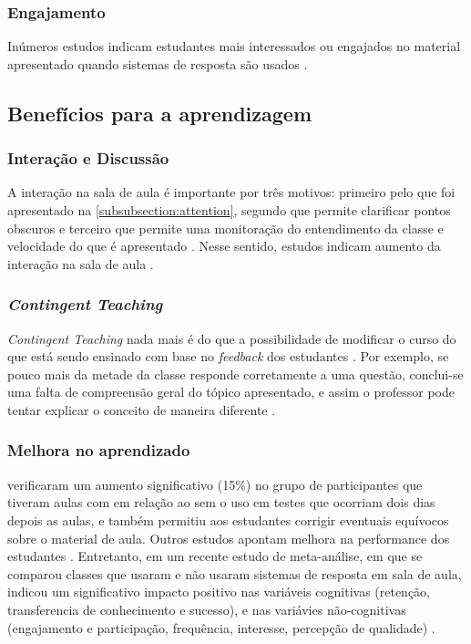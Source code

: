 \subsubsection{Engajamento}
Inúmeros estudos indicam estudantes mais interessados ou engajados no material
apresentado quando sistemas de resposta são usados
\cite{Kaya2016, Rana2016, Horne2015, Mattos2015, Moratelli2014, Kulatunga2014, Blood2013, Terrion2012,
Caldwell2007}.

\subsection{Benefícios para a aprendizagem}

\subsubsection{Interação e Discussão}
A interação na sala de aula é importante por três motivos: primeiro pelo que foi
apresentado na \autoref{subsubsection:attention}, segundo que permite clarificar
pontos obscuros e terceiro que permite uma monitoração do entendimento da classe
e velocidade do que é apresentado \cite{DInverno2003}. Nesse sentido, estudos
indicam aumento da interação na sala de aula \cite{Mattos2015, Barragues2011, Titman2011, Mayer2009, Caldwell2007}.

\subsubsection{\textit{Contingent Teaching}}\label{sussubsection:contingent}
\textit{Contingent Teaching} nada mais é do que a possibilidade de modificar
o curso do que está sendo ensinado com base no \textit{feedback} dos estudantes
\cite{Arnesen2013, Caldwell2007}. Por exemplo, se pouco mais da metade da classe
responde corretamente a uma questão, conclui-se uma falta de compreensão geral do
tópico apresentado, e assim o professor pode tentar explicar o conceito
de maneira diferente \cite{Terrion2012, Strasser2010}.

\subsubsection{Melhora no aprendizado}
 verificaram um aumento significativo (15\%) no grupo de
participantes que tiveram aulas com {\clickers} em relação ao sem o uso em testes que
ocorriam dois dias depois as aulas, e também permitiu aos estudantes corrigir
eventuais equívocos sobre o material de aula. Outros estudos apontam melhora
na performance dos estudantes \cite{Sun2014, Caldwell2007}. Entretanto, em um recente estudo de meta-análise,
em que se comparou classes que usaram e não usaram sistemas de resposta em sala de aula,
indicou um significativo impacto positivo nas variáveis cognitivas (retenção,
transferencia de conhecimento e sucesso), e nas variávies não-cognitivas (engajamento e participação, frequência, interesse,
percepção de qualidade) \cite{Hunsu2016}.


